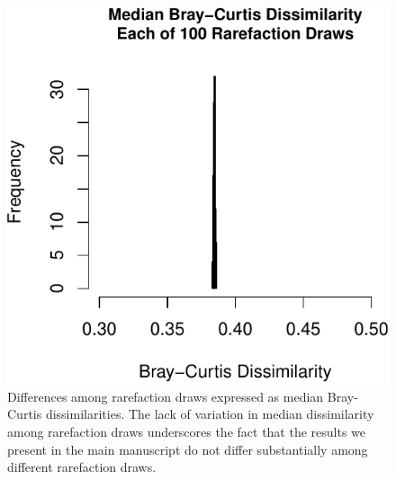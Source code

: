 \documentclass[fleqn,10pt,lineno]{wlpeerj} %
\begin{document}
\begin{figure}[!ht]

{\centering \includegraphics{figures/Supplement_Rarefaction_data-1} 

}

\caption{\label{fig:SuppFig1} Differences among rarefaction draws expressed as median Bray-Curtis dissimilarities. The lack of variation in median dissimilarity among rarefaction draws underscores the fact that the results we present in the main manuscript do not differ substantially among different rarefaction draws.}\label{fig:Supplement_Rarefaction_data}
\end{figure}
\end{document}
